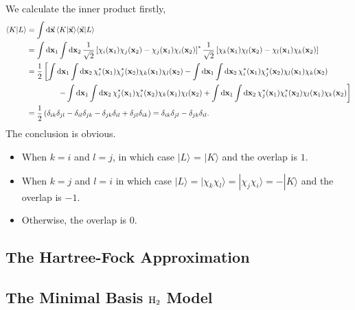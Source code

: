 \documentclass[a4paper]{book}
\newcounter{solution}[chapter]
\newcommand*{\dif}{\mathop{}\!\mathrm{d}}
\newcommand{\bfx}{{\bf x}}
\begin{document}
	\begin{solution}
	We calculate the inner product firstly,
	\begin{align*}
		\langle K | L \rangle &= \int \dif \vec{\bfx} \, \langle K | \vec{\bfx} \rangle \langle \vec{\bfx} | L \rangle \\
		&= \int \dif \bfx_1 \int \dif \bfx_2 \, \frac{1}{\sqrt{2}}\left[ \chi_i(\bfx_1) \chi_j(\bfx_2) - \chi_j(\bfx_1) \chi_i(\bfx_2) \right]^* \frac{1}{\sqrt{2}}\left[ \chi_k(\bfx_1) \chi_l(\bfx_2) - \chi_l(\bfx_1) \chi_k(\bfx_2) \right] \\
		&= \frac{1}{2} \left[ \int \dif \bfx_1 \int \dif \bfx_2 \, \chi^*_i(\bfx_1) \chi^*_j(\bfx_2) \chi_k(\bfx_1) \chi_l(\bfx_2) - \int \dif \bfx_1 \int \dif \bfx_2 \, \chi^*_i(\bfx_1) \chi^*_j(\bfx_2) \chi_l(\bfx_1) \chi_k(\bfx_2)\right. \\
		&\hspace{4em} \left. - \int \dif \bfx_1 \int \dif \bfx_2 \, \chi^*_j(\bfx_1) \chi^*_i(\bfx_2) \chi_k(\bfx_1) \chi_l(\bfx_2) + \int \dif \bfx_1 \int \dif \bfx_2 \, \chi^*_j(\bfx_1) \chi^*_i(\bfx_2) \chi_l(\bfx_1) \chi_k(\bfx_2) \right] \\
		&= \frac{1}{2} \left( \delta_{ik} \delta_{jl} - \delta_{il}\delta_{jk} - \delta_{jk} \delta_{il} + \delta_{jl}\delta_{ik}\right) = \delta_{ik}\delta_{jl} - \delta_{jk} \delta_{il}.
	\end{align*}
	The conclusion is obvious. 
	\begin{itemize}
	
	\item When $k=i$ and $l=j$, in which case $|L\rangle$ = $|K\rangle$ and the overlap is $1$.
	
	\item When $k=j$ and $l=i$ in which case $|L\rangle = | \chi_k \chi_l \rangle = |\chi_j \chi_i \rangle = -|K\rangle$ and the overlap is $-1$.
	
	\item Otherwise, the overlap is $0$.
	
	\end{itemize}
	\end{solution}
	
	\subsection{The Hartree-Fock Approximation}
	
	\subsection{The Minimal Basis \texorpdfstring{$\ce{H2}$}- Model}
	
\end{document}
